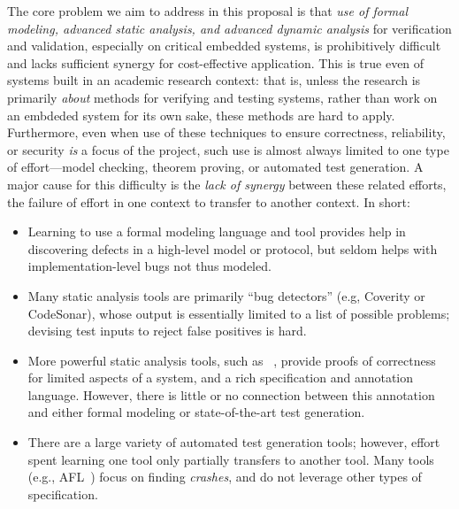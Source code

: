 The core problem we aim to address in this proposal is that \emph{use of formal modeling, advanced static analysis, and advanced dynamic analysis} for verification and validation, especially on critical embedded systems, is prohibitively difficult and lacks sufficient synergy for cost-effective application.  This is true even of systems built in an academic research context: that is, unless the research is primarily \emph{about} methods for verifying and testing systems, rather than work on an embdeded system for its own sake, these methods are hard to apply.  Furthermore, even when use of these techniques to ensure correctness, reliability, or security \emph{is} a focus of the project, such use is almost always limited to one type of effort---model checking, theorem proving, or automated test generation.  A major cause for this difficulty is the \emph{lack of synergy} between these related efforts, the failure of effort in one context to transfer to another context.  In short:

\begin{itemize}[labelsep=3pt,leftmargin=12pt]
\item Learning to use a formal modeling language and tool
 provides help in discovering defects in a high-level model or protocol, but seldom helps with implementation-level bugs not thus modeled.
\item Many static analysis tools are primarily ``bug detectors'' (e.g, Coverity or CodeSonar), whose output is essentially limited to a list of possible problems; devising test inputs to reject false positives is hard.
\item More powerful static analysis tools, such as \framac~\cite{KKP2015:FAC}, provide proofs of correctness for limited aspects of a system, and a rich specification and annotation language.  However, there is little or no connection between this annotation and either formal modeling or state-of-the-art test generation.
\item There are a large variety of automated test generation tools; however, effort spent learning one tool only partially transfers to another tool.  Many tools (e.g., AFL~\cite{aflfuzz}) focus on finding \emph{crashes}, and do not leverage  other types of specification.
\end{itemize}

